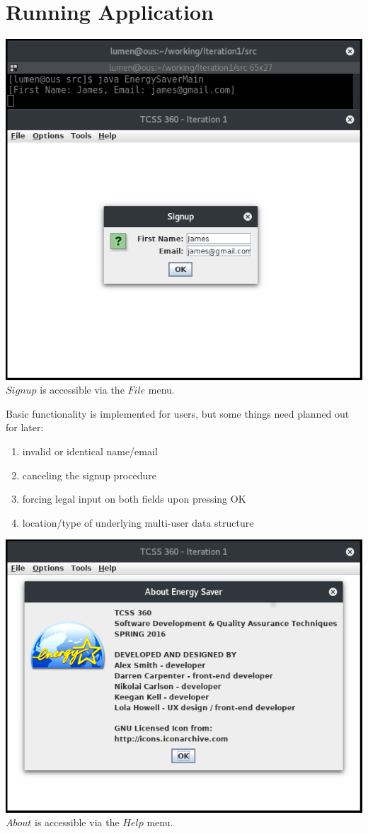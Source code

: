 \documentclass[paper=a4, fontsize=11pt]{scrartcl} %
\numberwithin{equation}{section} %
\numberwithin{figure}{section} %
\numberwithin{table}{section} %
\begin{document}
\section{Running Application}
\begin{center}
\includegraphics[scale=0.45]{signup.png}\\
$Signup$ is accessible via the $File$ menu.
\end{center}
Basic functionality is implemented for users, but some things need planned out for later:
\begin{enumerate}
\item invalid or identical name/email
\item canceling the signup procedure
\item forcing legal input on both fields upon pressing OK
\item location/type of underlying multi-user data structure
\end{enumerate}
\begin{center}
\includegraphics[scale=0.45]{about.png}\\
$About$ is accessible via the $Help$ menu.
\end{center}
\end{document}
